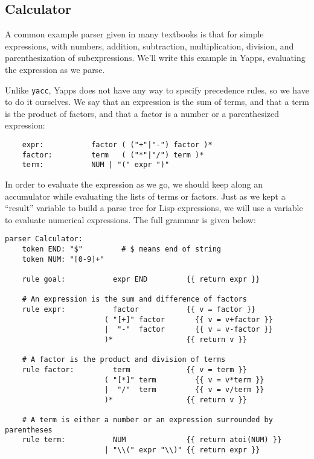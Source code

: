 \documentclass[10pt]{article}
\newcommand{\mysubsection}[1]{\subsection{\textcolor{darkerblue}{#1}}}
\begin{document}
\mysubsection{Calculator}

A common example parser given in many textbooks is that for simple
expressions, with numbers, addition, subtraction, multiplication,
division, and parenthesization of subexpressions.  We'll write this
example in Yapps, evaluating the expression as we parse.

Unlike \texttt{yacc}, Yapps does not have any way to specify
precedence rules, so we have to do it ourselves.  We say that an
expression is the sum of terms, and that a term is the product of
factors, and that a factor is a number or a parenthesized expression:

\begin{verbatim}
    expr:           factor ( ("+"|"-") factor )*
    factor:         term   ( ("*"|"/") term )*
    term:           NUM | "(" expr ")"
\end{verbatim}

In order to evaluate the expression as we go, we should keep along an
accumulator while evaluating the lists of terms or factors.  Just as
we kept a ``result'' variable to build a parse tree for Lisp
expressions, we will use a variable to evaluate numerical
expressions.  The full grammar is given below:

\begin{verbatim}
parser Calculator:
    token END: "$"         # $ means end of string
    token NUM: "[0-9]+"

    rule goal:           expr END         {{ return expr }}

    # An expression is the sum and difference of factors
    rule expr:           factor           {{ v = factor }}
                       ( "[+]" factor       {{ v = v+factor }}
                       |  "-"  factor       {{ v = v-factor }}
                       )*                 {{ return v }}

    # A factor is the product and division of terms
    rule factor:         term             {{ v = term }}
                       ( "[*]" term         {{ v = v*term }}
                       |  "/"  term         {{ v = v/term }}
                       )*                 {{ return v }}

    # A term is either a number or an expression surrounded by parentheses
    rule term:           NUM              {{ return atoi(NUM) }}
                       | "\\(" expr "\\)" {{ return expr }}
\end{verbatim}
\end{document}
